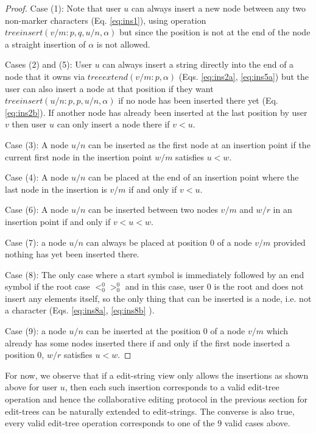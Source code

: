 \documentclass{amsart}
\begin{document}
\begin{proof}
Case (1): Note that user $u$ can always insert a new node between any two non-marker
characters (Eq. \ref{eq:ins1}), using operation $treeinsert(v/m:p,q,u/n,\alpha)$ but
since the position is not at the end of the node a straight insertion of $\alpha$ is not allowed.

Cases (2) and (5): User $u$ can always insert a string
directly into the end of a node that it owns via $treeextend(v/m:p,\alpha)$
 (Eqs. \ref{eq:ins2a}, \ref{eq:ins5a}) 
but the user can also insert a node at that position if they want $treeinsert(u/n:p,p,u/n,\alpha)$ if no node has been inserted there yet
 (Eq. \ref{eq:ins2b}). If another node has already been inserted at the
last position by user $v$ then user $u$ can only insert a node there if $v<u$.

Case (3):
A node $u/n$ can be inserted as the first node at an insertion point if the current
first node in the insertion point $w/m$ satisfies $u<w$.

Case (4):
A node $u/n$ can be placed at the end of an insertion point where the last node in the insertion is $v/m$ if and only if $v<u$.

Case (6):
A node $u/n$ can be inserted between two nodes $v/m$ and $w/r$ in an insertion point if and only if $v<u<w$.

Case (7): a node $u/n$ can always be placed at position 0 of a node $v/m$ provided nothing has yet been inserted there.

Case (8): 
The only case where a start symbol is immediately followed by an end symbol
if the root case $<^0_0>^0_0$ and in this case, user 0 is the root and does not insert any elements itself, so the only thing that can be inserted is a node, i.e. not a character (Eqs. \ref{eq:ins8a}, \ref{eq:ins8b} ).

Case (9): a node $u/n$ can be inserted at the position 0 of a node $v/m$ which already has some nodes inserted there if and only if the first node inserted a position 0, $w/r$ satisfies $u<w$.

\end{proof}



For now, we observe that if a edit-string view only allows the insertions
as shown above for user $u$, then each such insertion corresponds to a valid
edit-tree operation and hence the collaborative editing protocol in the previous
section for edit-trees can be naturally extended to edit-strings.  The converse
is also true, every valid edit-tree operation corresponds to one of the 9 valid cases above.
\end{document}
